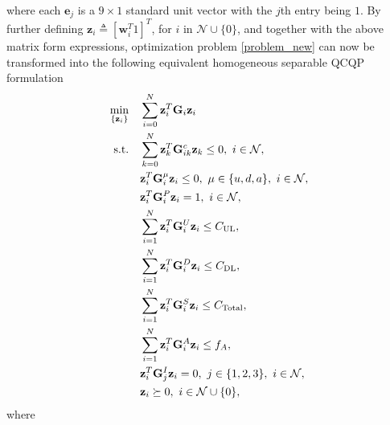\documentclass[10pt,journal,compsoc]{IEEEtran}
\begin{document}
where each $\mathbf{e}_{j}$ is a $9\times 1$ standard unit vector
with the $j$th entry being $1$.
By further defining $\mathbf{z}_i\triangleq[\mathbf{w}_i^T 1]^T$,
for $i$ in $\mathcal{N}\cup\{0\}$, and together with the above
matrix form expressions, optimization problem \eqref{problem_new}
can now be transformed into the following equivalent homogeneous
separable QCQP formulation
\begin{align}
\min\limits_{\{\mathbf{z}_i\}}
&\quad \sum_{i=0}^N\mathbf{z}_i^T\mathbf{G}_i\mathbf{z}_i\label{Eq_homo_QCQP}\allowdisplaybreaks\\
\text{s.t.}
&\quad \sum_{k=0}^N\mathbf{z}_k^T\mathbf{G}^c_{ik}\mathbf{z}_k\leq 0,\ i \in\mathcal{N},\label{Eq_homo_QCQP.a}\allowdisplaybreaks\\
&\quad \mathbf{z}_i^T\mathbf{G}^\mu_{i}\mathbf{z}_i\leq 0,\ \mu\in\{u,d,a\},\ i \in\mathcal{N},\label{Eq_homo_QCQP.b}\allowdisplaybreaks\\
&\quad \mathbf{z}_i^T\mathbf{G}^P_{i}\mathbf{z}_i=1,\ i \in\mathcal{N},\label{Eq_homo_QCQP.c}\\
&\quad \sum_{i=1}^N\mathbf{z}_i^T\mathbf{G}^{U}_i\mathbf{z}_i\leq C_{\mathrm{UL}},\label{Eq_homo_QCQP.d}\\
&\quad \sum_{i=1}^N\mathbf{z}_i^T\mathbf{G}^{D}_i\mathbf{z}_i\leq C_{\mathrm{DL}},\label{Eq_homo_QCQP.e}\\
&\quad \sum_{i=1}^N\mathbf{z}_i^T\mathbf{G}^{S}_i\mathbf{z}_i\leq C_{\mathrm{Total}},\label{Eq_homo_QCQP.total}\\
&\quad \sum_{i=1}^N\mathbf{z}_i^T\mathbf{G}^{A}_i\mathbf{z}_i\leq f_A,\allowdisplaybreaks\label{Eq_homo_QCQP.f}\\
&\quad \mathbf{z}_i^T\mathbf{G}^{I}_j\mathbf{z}_i=0,\  j \in\{ 1,2,3\},\ i \in\mathcal{N},\label{Eq_homo_QCQP.g}\allowdisplaybreaks\\
&\quad \mathbf{z}_i \succeq 0,\ i \in\mathcal{N}\cup\{0\},
\allowdisplaybreaks\label{Eq_homo_QCQP.h}
\end{align}
where
\end{document}
